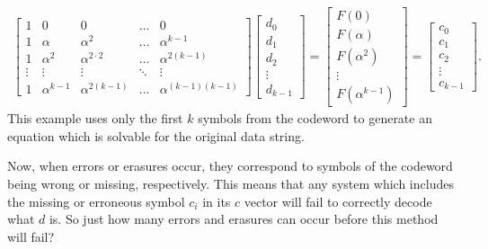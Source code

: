 \documentclass[11pt]{article}
\begin{document}
\begin{align*}
\begin{bmatrix}
1 & 0 & 0 & \dotsc & 0 \\
1 & \alpha & \alpha^{2} & \dotsc & \alpha^{k-1} \\
1 & \alpha^{2} & \alpha^{2\cdot2} & \dotsc & \alpha^{2(k-1)} \\
\vdots & \vdots & \vdots & \ddots & \vdots \\
1 & \alpha^{k-1} & \alpha^{2(k-1)} & \dotsc & \alpha^{(k-1)(k-1)} 
\end{bmatrix}
\begin{bmatrix}
d_{0}\\
d_{1}\\
d_{2}\\
\vdots\\
d_{k-1}
\end{bmatrix}
=
\begin{bmatrix}
F(0)\\
F(\alpha)\\
F(\alpha^{2})\\
\vdots\\
F(\alpha^{k-1})
\end{bmatrix}
=
\begin{bmatrix}
c_{0}\\
c_{1}\\
c_{2}\\
\vdots\\
c_{k-1}
\end{bmatrix}.
\end{align*}
This example uses only the first $k$ symbols from the codeword to generate an equation which is solvable for the original data string.
\cite[257-260]{ascodingtheory}

Now, when errors or erasures occur, they correspond to symbols of the codeword being wrong or missing, respectively. This means that any system which includes the missing or erroneous symbol $c_{i}$ in its $c$ vector will fail to correctly decode what $d$ is. So just how many errors and erasures can occur before this method will fail?
\end{document}
